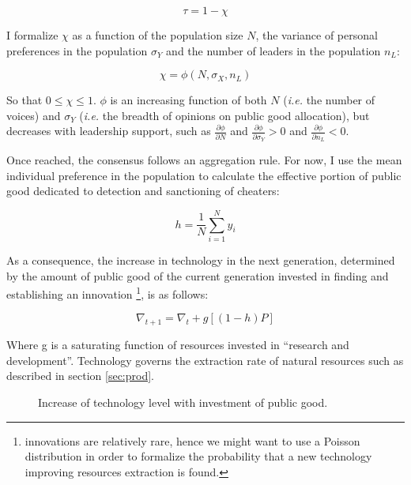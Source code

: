 \documentclass[a4paper]{article}
\begin{document}
\begin{equation}
\tau=1-\chi
\end{equation}

I formalize $\chi$ as a function of the population size $N$, the variance of personal preferences in the population $\sigma_Y$ and the number of leaders in the population $n_L$:

\begin{equation}
\chi = \phi\left(N,\sigma_X,n_L\right)
\end{equation}  

So that $0\le\chi\le1$. $\phi$ is an increasing function of both $N$ (\textit{i.e.} the number of voices) and $\sigma_Y$ (\textit{i.e.} the breadth of opinions on public good allocation), but decreases with leadership support, such as $\frac{\partial\phi}{\partial N}$ and $\frac{\partial\phi}{\partial\sigma_Y}>0$ and $\frac{\partial\phi}{\partial n_L}<0$.

Once reached, the consensus follows an aggregation rule. For now, I use the mean individual preference in the population to calculate the effective portion of public good dedicated to detection and sanctioning of cheaters:

\begin{equation}
h=\frac{1}{N} \sum_{i=1}^{N}y_i
\end{equation}

As a consequence, the increase in technology in the next generation, determined by the amount of public good of the current generation invested in finding and establishing an innovation \footnote{innovations are relatively rare, hence we might want to use a Poisson distribution in order to formalize the probability that a new technology improving resources extraction is found.}, is as follows:

\begin{equation}
\nabla_{t+1}=\nabla_t + g\left[\left(1-h\right)P\right]
\end{equation}

Where g is a saturating function of resources invested in ``research and development''. Technology governs the extraction rate of natural resources such as described in section \ref{sec:prod}.

\begin{figure}[!htbp]
	\begin{center}
	\end{center}
	\caption{Increase of technology level with investment of public good.}
	\label{fig:techfunc}
\end{figure} 
\end{document}
